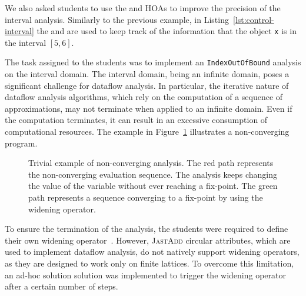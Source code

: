 We also asked students to use the  and 
HOAs to improve the precision of the interval analysis. Similarly to the previous example, in
Listing~\ref{lst:control-interval} the  and 
are used to keep track of the information that the object \texttt{x} is in the interval $[5,6]$.


The task assigned to the students was to implement an \texttt{IndexOutOfBound} analysis on the interval domain.
The interval domain, being an infinite domain, poses a significant challenge for
dataflow analysis. In particular,
the iterative nature of dataflow analysis algorithms, which rely on the computation
of a sequence of approximations, may not terminate when applied to an infinite domain.
Even if the computation terminates, it can result in an excessive consumption of computational resources.
The example in Figure~\ref{fig:nonConverging}
illustrates a non-converging program.
\begin{figure}
	\centering
	\caption{\label{fig:nonConverging} Trivial example of non-converging analysis.
  The {\color{red}red} path represents the non-converging evaluation sequence.
  The analysis keeps changing the value of the variable  without ever
  reaching a fix-point. The {\color{ForestGreen}green} path represents a
  sequence converging to a fix-point by using the widening operator.
  }
\end{figure}

To ensure the termination of the analysis, the students were required to
define their own widening operator~\cite{Bagnara2003Widening}.
However, \textsc{JastAdd} circular attributes, which are used to implement dataflow
analysis, do not natively support widening operators, as they are designed
to work only on finite lattices. To overcome this limitation, an ad-hoc solution
solution was implemented to trigger the widening operator after a certain
number of steps.

